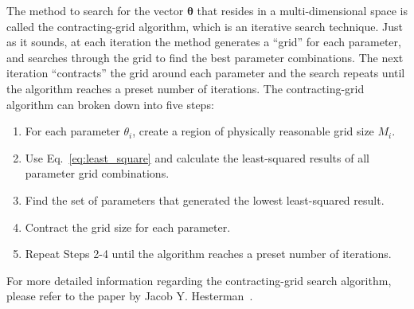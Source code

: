 The method to search for the vector $\boldsymbol{\theta}$ that resides in a multi-dimensional space is called the contracting-grid algorithm, which is an iterative search technique.  Just as it sounds, at each iteration the method generates a ``grid'' for each parameter, and searches through the grid to find the best parameter combinations.  The next iteration ``contracts'' the grid around each parameter and the search repeats until the algorithm reaches a preset number of iterations.
The contracting-grid algorithm can broken down into five steps:
%
\begin{enumerate}
\item For each parameter $\theta_i$, create a region of physically reasonable grid size $M_i$.
\item Use Eq.~\ref{eq:least_square} and calculate the least-squared results of all parameter grid combinations.
\item Find the set of parameters that generated the lowest least-squared result.
\item Contract the grid size for each parameter.
\item Repeat Steps 2-4 until the algorithm reaches a preset number of iterations.
\end{enumerate}
For more detailed information regarding the contracting-grid search algorithm, please refer to the paper by Jacob Y. Hesterman~\citep{Hesterman2010}.  

